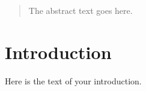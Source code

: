 \documentclass{article}
\author{Piero Marini}
\title{}
\begin{document}
\maketitle

\begin{abstract}
The abstract text goes here.
\end{abstract}

\section{Introduction}
Here is the text of your introduction.
\end{document}
